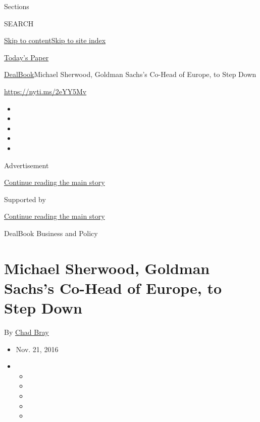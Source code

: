 Sections

SEARCH

\protect\hyperlink{site-content}{Skip to
content}\protect\hyperlink{site-index}{Skip to site index}

\href{https://myaccount.nytimes3xbfgragh.onion/auth/login?response_type=cookie\&client_id=vi}{}

\href{https://www.nytimes3xbfgragh.onion/section/todayspaper}{Today's
Paper}

\href{/section/business/dealbook}{DealBook}\textbar{}Michael Sherwood,
Goldman Sachs's Co-Head of Europe, to Step Down

\url{https://nyti.ms/2eYY5Mv}

\begin{itemize}
\item
\item
\item
\item
\item
\end{itemize}

Advertisement

\protect\hyperlink{after-top}{Continue reading the main story}

Supported by

\protect\hyperlink{after-sponsor}{Continue reading the main story}

DealBook Business and Policy

\hypertarget{michael-sherwood-goldman-sachss-co-head-of-europe-to-step-down}{%
\section{Michael Sherwood, Goldman Sachs's Co-Head of Europe, to Step
Down}\label{michael-sherwood-goldman-sachss-co-head-of-europe-to-step-down}}

By \href{http://www.nytimes3xbfgragh.onion/by/chad-bray}{Chad Bray}

\begin{itemize}
\item
  Nov. 21, 2016
\item
  \begin{itemize}
  \item
  \item
  \item
  \item
  \item
  \end{itemize}
\end{itemize}

